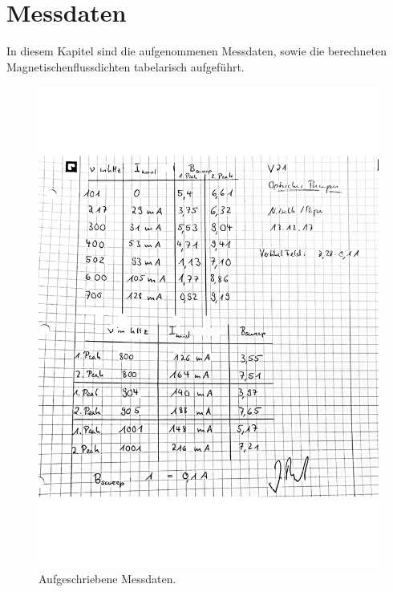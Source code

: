 \section{Messdaten}

In diesem Kapitel sind die aufgenommenen Messdaten, sowie die berechneten
Magnetischenflussdichten tabelarisch aufgeführt.





\newpage

\begin{figure}[h]
  \centering
  \includegraphics[width = \textwidth]{Pics/V21_Messdaten}
  \caption{Aufgeschriebene Messdaten.}
  \label{fig:aufgeschMessdaten}
\end{figure}

